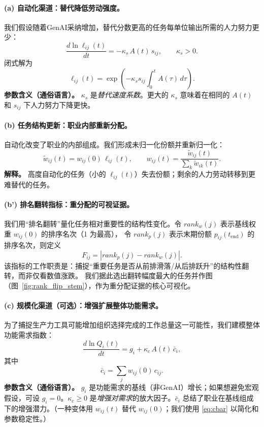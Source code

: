 \paragraph{(a) 自动化渠道：替代降低劳动强度。}
我们假设随着GenAI采纳增加，替代分数更高的任务每单位输出所需的人力努力更少：
\begin{equation}
\label{eq:labor_intensity_ode}
\frac{d \ln \ell_{ij}(t)}{dt} = -\kappa_s\,A(t)\,s_{ij}, \qquad \kappa_s>0.
\end{equation}
闭式解为
\begin{equation}
\label{eq:labor_intensity_closed}
\ell_{ij}(t) = \exp\!\left(-\kappa_s s_{ij}\int_0^t A(\tau)\,d\tau\right).
\end{equation}
\indent\textbf{参数含义（通俗语言）。} $\kappa_s$ 是\emph{替代速度系数}。更大的 $\kappa_s$ 意味着在相同的 $A(t)$ 和 $s_{ij}$ 下人力努力下降更快。

\paragraph{(b) 任务结构更新：职业内部重新分配。}
自动化改变了职业的内部组成。我们形成未归一化份额并重新归一化：
\begin{equation}
\label{eq:share_update}
\tilde w_{ij}(t) = w_{ij}(0)\,\ell_{ij}(t), 
\qquad
w_{ij}(t)=\frac{\tilde w_{ij}(t)}{\sum_{k} \tilde w_{ik}(t)}.
\end{equation}
\indent\textbf{解释。} 高度自动化的任务（小的 $\ell_{ij}(t)$）失去份额；剩余的人力劳动转移到更难替代的任务。

\paragraph{(b') 排名翻转指标：重分配的可视证据。}
我们用“排名翻转”量化任务相对重要性的结构性变化。令 $rank_w(j)$ 表示基线权重 $w_{ij}(0)$ 的排序名次（1 为最高），
令 $rank_p(j)$ 表示末期份额 $p_{ij}(t_{\text{end}})$ 的排序名次，则定义
\begin{equation}
\label{eq:rank_flip}
F_{ij}=\left|rank_p(j)-rank_w(j)\right|.
\end{equation}
该指标的工作职责是：捕捉“重要任务是否从前排滑落/从后排跃升”的结构性翻转，而非仅看数值涨跌。
我们据此选出翻转幅度最大的任务并作图（图~\ref{fig:rank_flip_stem}），作为重分配证据的核心可视化。

\paragraph{(c) 规模化渠道（可选）：增强扩展整体功能需求。}
为了捕捉生产力工具可能增加组织选择完成的工作总量这一可能性，我们建模整体功能需求指数：
\begin{equation}
\label{eq:Q_ode}
\frac{d \ln Q_i(t)}{dt} = g_i + \kappa_c\,A(t)\,\bar c_i,
\end{equation}
其中
\begin{equation}
\label{eq:cbar}
\bar c_i = \sum_{j} w_{ij}(0)\,c_{ij}.
\end{equation}
\indent\textbf{参数含义（通俗语言）。} $g_i$ 是功能需求的基线（非GenAI）增长；如果想避免宏观假设，可设 $g_i=0$。$\kappa_c\ge 0$ 是\emph{增强对需求}的放大因子。$\bar c_i$ 总结了职业在基线组成下的增强潜力。（一种变体用 $w_{ij}(t)$ 替代 $w_{ij}(0)$；我们使用 \eqref{eq:cbar} 以简化和参数稳定性。）

